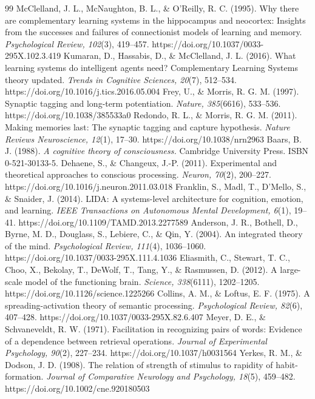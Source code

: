 \documentclass[11pt]{article}
\begin{document}
\begin{thebibliography}{99}
 McClelland, J. L., McNaughton, B. L., \& O'Reilly, R. C. (1995). Why there are
complementary learning systems in the hippocampus and neocortex: Insights from the successes and failures
of connectionist models of learning and memory. \emph{Psychological Review, 102}(3), 419--457.
https://doi.org/10.1037/0033-295X.102.3.419
 Kumaran, D., Hassabis, D., \& McClelland, J. L. (2016). What learning systems do
intelligent agents need? Complementary Learning Systems theory updated. \emph{Trends in Cognitive
Sciences, 20}(7), 512--534. https://doi.org/10.1016/j.tics.2016.05.004
 Frey, U., \& Morris, R. G. M. (1997). Synaptic tagging and long-term potentiation.
\emph{Nature, 385}(6616), 533--536. https://doi.org/10.1038/385533a0
 Redondo, R. L., \& Morris, R. G. M. (2011). Making memories last: The synaptic
tagging and capture hypothesis. \emph{Nature Reviews Neuroscience, 12}(1), 17--30.
https://doi.org/10.1038/nrn2963
 Baars, B. J. (1988). \emph{A cognitive theory of consciousness.} Cambridge University
Press. ISBN 0-521-30133-5.
 Dehaene, S., \& Changeux, J.-P. (2011). Experimental and theoretical approaches to
conscious processing. \emph{Neuron, 70}(2), 200--227. https://doi.org/10.1016/j.neuron.2011.03.018
 Franklin, S., Madl, T., D'Mello, S., \& Snaider, J. (2014). LIDA: A systems-level
architecture for cognition, emotion, and learning. \emph{IEEE Transactions on Autonomous Mental
Development, 6}(1), 19--41. https://doi.org/10.1109/TAMD.2013.2277589
 Anderson, J. R., Bothell, D., Byrne, M. D., Douglass, S., Lebiere, C., \& Qin, Y.
(2004). An integrated theory of the mind. \emph{Psychological Review, 111}(4), 1036--1060.
https://doi.org/10.1037/0033-295X.111.4.1036
 Eliasmith, C., Stewart, T. C., Choo, X., Bekolay, T., DeWolf, T., Tang, Y., \&
Rasmussen, D. (2012). A large-scale model of the functioning brain. \emph{Science, 338}(6111),
1202--1205. https://doi.org/10.1126/science.1225266
 Collins, A. M., \& Loftus, E. F. (1975). A spreading-activation theory of semantic
processing. \emph{Psychological Review, 82}(6), 407--428. https://doi.org/10.1037/0033-295X.82.6.407
 Meyer, D. E., \& Schvaneveldt, R. W. (1971). Facilitation in recognizing pairs of
words: Evidence of a dependence between retrieval operations. \emph{Journal of Experimental Psychology,
90}(2), 227--234. https://doi.org/10.1037/h0031564
 Yerkes, R. M., \& Dodson, J. D. (1908). The relation of strength of stimulus to
rapidity of habit-formation. \emph{Journal of Comparative Neurology and Psychology, 18}(5), 459--482.
https://doi.org/10.1002/cne.920180503
\end{thebibliography}
\end{document}

